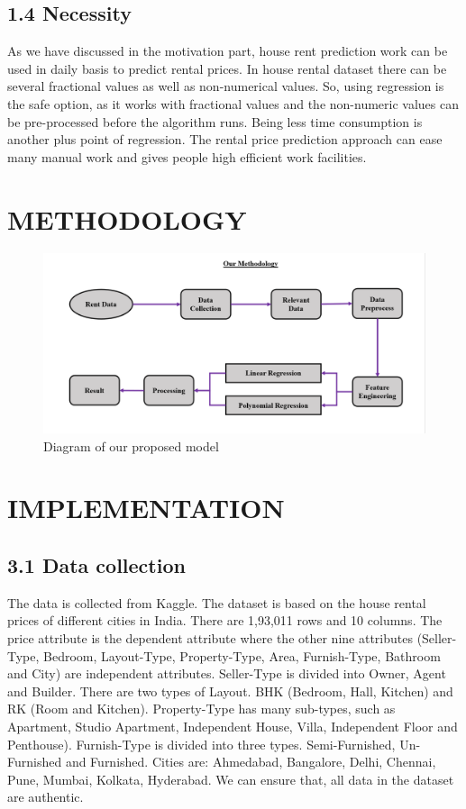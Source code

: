 \documentclass[conference]{IEEEtran}[10]
\begin{document}
\subsection*{1.4 Necessity}
As we have discussed in the motivation part, house rent prediction work can be used in daily basis to predict rental prices. In house rental dataset there can be several fractional values as well as non-numerical values. So, using regression is the safe option, as it works with fractional values and the non-numeric values can be pre-processed before the algorithm runs. Being less time consumption is another plus point of regression. The rental price prediction approach can ease many  manual work and gives people high efficient work facilities. 

\section{METHODOLOGY}
\begin{figure}[H]
\centering
\includegraphics[scale=0.2]{methodology}
\caption{ Diagram of our proposed model}
\end{figure}
\section{IMPLEMENTATION}
\subsection{3.1 Data collection}
The data is collected from Kaggle. The dataset is based on the house rental prices of different cities in India. There are 1,93,011 rows and 10 columns. The price attribute is the dependent attribute where the other nine attributes (Seller-Type, Bedroom, Layout-Type, Property-Type, Area, Furnish-Type, Bathroom and City) are independent attributes. Seller-Type is divided into Owner, Agent and Builder. There are two types of Layout. BHK (Bedroom, Hall, Kitchen) and RK (Room and Kitchen). Property-Type has many sub-types, such as Apartment, Studio Apartment, Independent House, Villa, Independent Floor and Penthouse). Furnish-Type is divided into three types. Semi-Furnished, Un-Furnished and Furnished.  Cities are: Ahmedabad, Bangalore, Delhi, Chennai, Pune, Mumbai, Kolkata, Hyderabad. We can ensure that, all data in the dataset are authentic.
\end{document}
